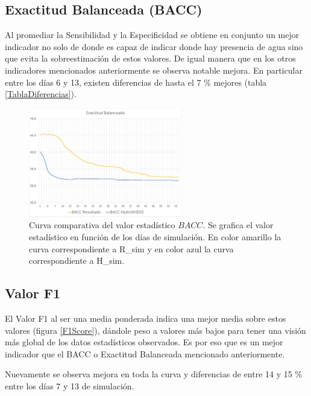 \documentclass[10pt,a4paper, twoside]{report}
\begin{document}
\subsection{Exactitud Balanceada (BACC)}

Al promediar la Sensibilidad y la Especificidad se obtiene en conjunto un mejor indicador no solo de donde es capaz de indicar donde hay presencia de agua sino que evita la sobreestimación de estos valores. De igual manera que en los otros indicadores mencionados anteriormente se observa notable mejora. En particular entre los días 6 y 13, existen diferencias de hasta el 7 \% mejores (tabla \ref{TablaDiferencias}).

\begin{figure}[H]
   \centering      
   \includegraphics[width=0.6\textwidth]{imagenes/BACC.jpg}
 \caption{Curva comparativa del valor estadístico $BACC$. Se grafica el valor estadístico en función de los días de simulación. En color amarillo la curva correspondiente a R\_sim y en color azul la curva correspondiente a H\_sim.}
 \label{BACC}
\end{figure}


\subsection{Valor F1}

El Valor F1 al ser una media ponderada indica una mejor media sobre estos valores (figura \ref{F1Score}), dándole peso a valores más bajos para tener una visión más global de los datos estadísticos observados. Es por eso que es un mejor indicador que el BACC o Exactitud Balanceada mencionado anteriormente.

Nuevamente se observa mejora en toda la curva y diferencias de entre 14 y 15 \% entre los días 7 y 13 de simulación.
\end{document}
